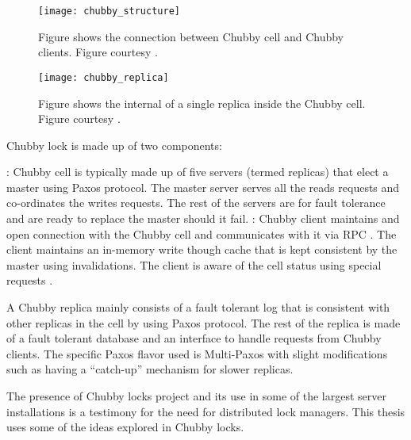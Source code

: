 \begin{figure}
  \texttt{[image: chubby\_structure]}
  \caption[Chubby structure]{%
    Figure shows the connection between Chubby cell and Chubby clients. 
    Figure courtesy \citet{Burrows06}.}
  \label{figure:chubby.structure}
\end{figure}

\begin{figure}
  \texttt{[image: chubby\_replica]}
  \caption[Chubby Replica]{%
    Figure shows the internal of a single replica inside the Chubby cell.
    Figure courtesy \citet{ChandraGR07}.}
  \label{figure:chubby.structure}
\end{figure}


Chubby lock is made up of two components:

\begin{itemize}
    : Chubby cell is typically made up of five servers 
    (termed replicas) that elect a master using Paxos protocol. The master
    server serves all the reads requests and co-ordinates the writes requests.
    The rest of the servers are for fault tolerance and are ready to replace the
    master should it fail.
    : Chubby client maintains and open connection with
    the Chubby cell and communicates with it via RPC%
    . The client maintains an in-memory write though cache that
    is kept consistent by the master using invalidations. The client is
    aware of the cell status using special requests%
    .
\end{itemize}

A Chubby replica mainly consists of a fault tolerant log that is consistent
with other replicas in the cell by using Paxos protocol. The rest of the
replica is made of a fault tolerant database and an interface to handle
requests from Chubby clients. The specific Paxos flavor used is Multi-Paxos
with slight modifications such as having a ``catch-up'' mechanism for
slower replicas.

The presence of Chubby locks project and its use in some of the largest 
server installations is a testimony for the need for distributed lock
managers. This thesis uses some of the ideas explored in Chubby locks.

